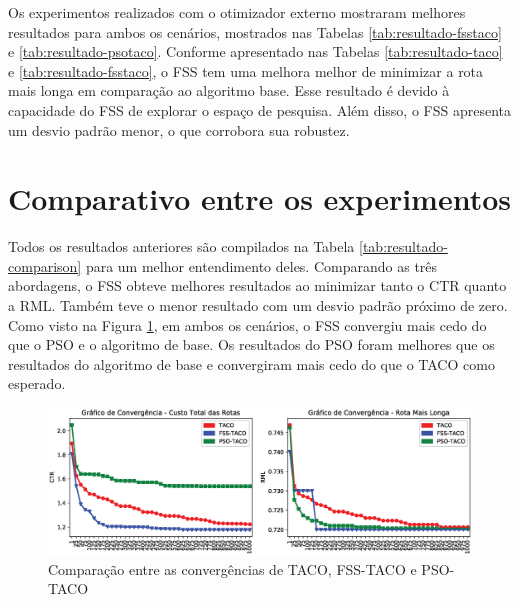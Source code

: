 Os experimentos realizados com o otimizador externo mostraram melhores resultados para ambos os cenários, mostrados nas Tabelas \ref{tab:resultado-fsstaco} e \ref{tab:resultado-psotaco}. Conforme apresentado nas Tabelas \ref{tab:resultado-taco} e \ref{tab:resultado-fsstaco}, o FSS tem uma melhora melhor de minimizar a rota mais longa em comparação ao algoritmo base. Esse resultado é devido à capacidade do FSS de explorar o espaço de pesquisa. Além disso, o FSS apresenta um desvio padrão menor, o que corrobora sua robustez.

\section{Comparativo entre os experimentos}
\label{sec-resultados-taco}

Todos os resultados anteriores são compilados na Tabela \ref{tab:resultado-comparison} para um melhor entendimento deles. Comparando as três abordagens, o FSS obteve melhores resultados ao minimizar tanto o CTR quanto a RML. Também teve o menor resultado com um desvio padrão próximo de zero. Como visto na Figura \ref{fig:resultados-convergencia}, em ambos os cenários, o FSS convergiu mais cedo do que o PSO e o algoritmo de base. Os resultados do PSO foram melhores que os resultados do algoritmo de base e convergiram mais cedo do que o TACO como esperado.

\begin{figure}[htb]
    \centering
    \includegraphics[width=\textwidth]{imagens/convergence-approaches.eps}
    \caption{Comparação entre as convergências de TACO, FSS-TACO e PSO-TACO} \label{fig:resultados-convergencia}
\end{figure}

